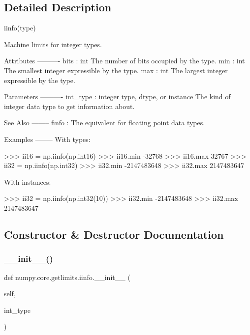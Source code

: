 \subsection{Detailed Description}
\begin{DoxyVerb}iinfo(type)

Machine limits for integer types.

Attributes
----------
bits : int
    The number of bits occupied by the type.
min : int
    The smallest integer expressible by the type.
max : int
    The largest integer expressible by the type.

Parameters
----------
int_type : integer type, dtype, or instance
    The kind of integer data type to get information about.

See Also
--------
finfo : The equivalent for floating point data types.

Examples
--------
With types:

>>> ii16 = np.iinfo(np.int16)
>>> ii16.min
-32768
>>> ii16.max
32767
>>> ii32 = np.iinfo(np.int32)
>>> ii32.min
-2147483648
>>> ii32.max
2147483647

With instances:

>>> ii32 = np.iinfo(np.int32(10))
>>> ii32.min
-2147483648
>>> ii32.max
2147483647\end{DoxyVerb}
 

\subsection{Constructor \& Destructor Documentation}
\mbox{\label{classnumpy_1_1core_1_1getlimits_1_1iinfo_aecf906846c23c1b96d98b4dc3365fabd}} 
\subsubsection{\texorpdfstring{\+\_\+\+\_\+init\+\_\+\+\_\+()}{\_\_init\_\_()}}
{\footnotesize\ttfamily def numpy.\+core.\+getlimits.\+iinfo.\+\_\+\+\_\+init\+\_\+\+\_\+ (\begin{DoxyParamCaption}\item[{}]{self,  }\item[{}]{int\+\_\+type }\end{DoxyParamCaption})}



